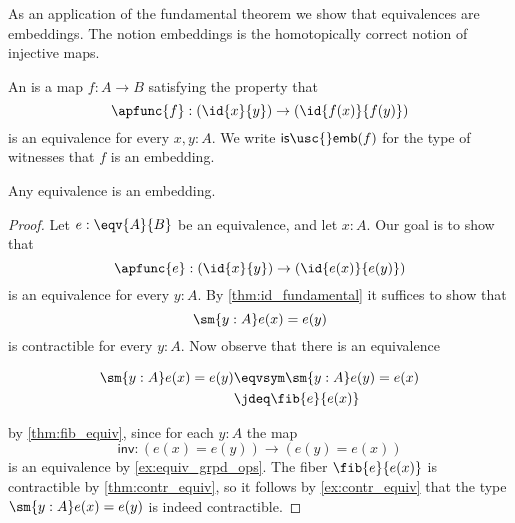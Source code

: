 As an application of the fundamental theorem we show that equivalences are embeddings. The notion embeddings is the homotopically correct notion of injective maps.

\begin{defn}
An  is a map $f:A\to B$ satisfying the property that
\begin{equation*}
\apfunc{f}:(\id{x}{y})\to(\id{f(x)}{f(y)})
\end{equation*}
is an equivalence for every $x,y:A$. We write $\mathsf{is\usc{}emb}(f)$ for the type of witnesses that $f$ is an embedding.
\end{defn}

\begin{cor}
\label{cor:emb_equiv} 
Any equivalence is an embedding.
\end{cor}

\begin{proof}
Let $e:\eqv{A}{B}$ be an equivalence, and let $x:A$. Our goal is to show that
\begin{equation*}
\apfunc{e} : (\id{x}{y})\to (\id{e(x)}{e(y)})
\end{equation*}
is an equivalence for every $y:A$. By \autoref{thm:id_fundamental} it suffices to show that 
\begin{equation*}
\sm{y:A}e(x)=e(y)
\end{equation*}
is contractible for every $y:A$. Now observe that there is an equivalence
\begin{samepage}
\begin{align*}
\sm{y:A}e(x)=e(y) & \eqvsym \sm{y:A}e(y)=e(x) \\
& \jdeq \fib{e}{e(x)}
\end{align*}
\end{samepage}
by \cref{thm:fib_equiv}, since for each $y:A$ the map
\begin{equation*}
\mathsf{inv} : (e(x)=e(y))\to (e(y)= e(x))
\end{equation*}
is an equivalence by \cref{ex:equiv_grpd_ops}.
The fiber $\fib{e}{e(x)}$ is contractible by \cref{thm:contr_equiv}, so it follows by \autoref{ex:contr_equiv} that the type $\sm{y:A}e(x)=e(y)$ is indeed contractible.
\end{proof}

